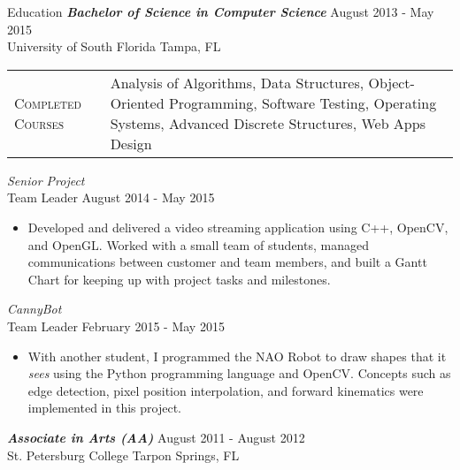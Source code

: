 \begin{section}{Education}
  {\sl \textbf{Bachelor of Science in Computer Science}} \hfill August 2013 - May 2015 \\
  University of South Florida \hfill Tampa, FL \\
  \begin{tabularx}{\linewidth}{@{}l X@{}}
    \textsc{Completed Courses} &\small{Analysis of Algorithms, Data Structures, Object-Oriented Programming, Software Testing, Operating Systems, Advanced Discrete Structures, Web Apps Design}\\
  \end{tabularx}
  {\sl Senior Project} \\ Team Leader \hfill August 2014 - May 2015
  \begin{itemize}
    \item Developed and delivered a video streaming application using C++, OpenCV, and OpenGL. Worked with a small team of students, managed communications between customer and team members, and built a Gantt Chart for keeping up with project tasks and milestones.
  \end{itemize}
  {\sl CannyBot} \\ Team Leader \hfill February 2015 - May 2015
  \begin{itemize}
    \item With another student, I programmed the NAO Robot to draw shapes that it \textit{sees} using the Python programming language and OpenCV. Concepts such as edge detection, pixel position interpolation, and forward kinematics were implemented in this project.
  \end{itemize}

  {\sl \textbf{Associate in Arts (AA)}} \hfill August 2011 - August 2012 \\
  St. Petersburg College \hfill Tarpon Springs, FL \\
\end{section}
